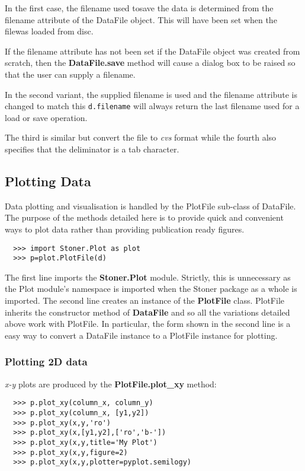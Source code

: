 \documentclass[a4paper,11pt]{scrartcl}
\begin{document}
In the first case, the filename used tosave the data is determined from the
filename attribute of the DataFile object. This will have been set when the
filewas loaded from disc.

If the filename attribute has not been set \eg if the DataFile object was
created from scratch, then the \textbf{DataFile.save} method will cause a dialog
box to be raised so that the user can supply a filename.

In the second variant, the supplied filename is used and the filename attribute
is changed to match this \ie \verb#d.filename# will always return the last
filename used for a load or save operation.

The third is similar but convert the file to \textit{cvs} format while the fourth also specifies that the deliminator is a tab character.

\subsection{Plotting Data}

Data plotting and visualisation is handled by the PlotFile sub-class of DataFile. The purpose of the methods detailed here is to provide quick and convenient ways to plot data rather than providing publication ready figures.

\begin{verbatim}
  >>> import Stoner.Plot as plot
  >>> p=plot.PlotFile(d)
\end{verbatim}

The first line imports the \textbf{Stoner.Plot} module. Strictly, this is unnecessary as the Plot module's namespace is imported when the Stoner package as a whole is imported. The second line creates an instance of the \textbf{PlotFile} class. PlotFile inherits the constructor method of \textbf{DataFile} and so all the variations detailed above work with PlotFile. In particular, the form shown in the second line is a easy way to convert a DataFile instance to a PlotFile instance for plotting.

\subsubsection{Plotting 2D data}

\textit{x-y} plots are produced by the \textbf{PlotFile.plot\_xy} method:

\begin{verbatim}
  >>> p.plot_xy(column_x, column_y)
  >>> p.plot_xy(column_x, [y1,y2])
  >>> p.plot_xy(x,y,'ro')
  >>> p.plot_xy(x,[y1,y2],['ro','b-'])
  >>> p.plot_xy(x,y,title='My Plot')
  >>> p.plot_xy(x,y,figure=2)
  >>> p.plot_xy(x,y,plotter=pyplot.semilogy)
\end{verbatim}
\end{document}
